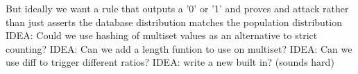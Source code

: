 \documentclass[journal]{IEEEtran}
\begin{document}





But ideally we want a rule that outputs a '0' or '1' and proves and attack rather than just asserts the database distribution matches the population distribution
IDEA: Could we use hashing of multiset values as an alternative to strict counting?
IDEA: Can we add a length funtion to use on multiset?
IDEA: Can we use diff to trigger different ratios?
IDEA: write a new built in? (sounds hard)
\end{document}
